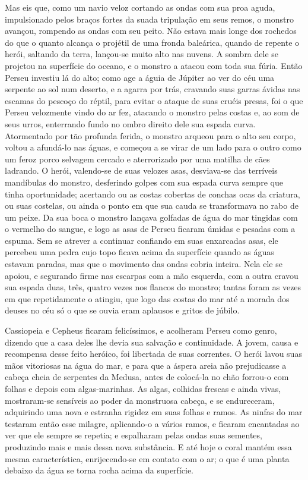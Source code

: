 Mas eis que, como um navio veloz cortando as ondas com sua proa aguda,
impulsionado pelos braços fortes da suada tripulação em seus remos, o
monstro avançou, rompendo as ondas com seu peito. Não estava mais
longe dos rochedos do que o quanto alcança o projétil de uma fronda
baleárica, quando de repente o herói, saltando da terra, lançou-se
muito alto nas nuvens. A sombra dele se projetou na superfície do
oceano, e o monstro a atacou com toda sua fúria. Então Perseu
investiu lá do alto; como age a águia de Júpiter ao ver do céu uma
serpente ao sol num deserto, e a agarra por trás, cravando suas
garras ávidas nas escamas do pescoço do réptil, para evitar o ataque
de suas cruéis presas, foi o que Perseu velozmente vindo do ar fez,
atacando o monstro pelas costas e, ao som de seus urros, enterrando
fundo no ombro direito dele sua espada curva. Atormentado por tão
profunda ferida, o monstro arqueou para o alto seu corpo, voltou a
afundá-lo nas águas, e começou a se virar de um lado para o outro
como um feroz porco selvagem cercado e aterrorizado por uma matilha
de cães ladrando. O herói, valendo-se de suas velozes asas,
desviava-se das terríveis mandíbulas do monstro, desferindo golpes
com sua espada curva sempre que tinha oportunidade; acertando ou as
costas cobertas de conchas ocas da criatura, ou suas costelas, ou
ainda o ponto em que sua cauda se transformava no rabo de um peixe.
Da sua boca o monstro lançava golfadas de água do mar tingidas com o
vermelho do sangue, e logo as asas de Perseu ficaram úmidas e pesadas
com a espuma. Sem se atrever a continuar confiando em suas enxarcadas
asas, ele percebeu uma pedra cujo topo ficava acima da superfície
quando as águas estavam paradas, mas que o movimento das ondas cobria
inteira. Nela ele se apoiou, e segurando firme nas escarpas com a mão
esquerda, com a outra cravou sua espada duas, três, quatro vezes nos
flancos do monstro; tantas foram as vezes em que repetidamente o
atingiu, que logo das costas do mar até a morada dos deuses no céu só
o que se ouvia eram aplausos e gritos de júbilo.

Cassiopeia e Cepheus ficaram felicíssimos, e acolheram Perseu como
genro, dizendo que a casa deles lhe devia sua salvação e
continuidade. A jovem, causa e recompensa desse feito heróico, foi
libertada de suas correntes. O herói lavou suas mãos vitoriosas na
água do mar, e para que a áspera areia não prejudicasse a cabeça
cheia de serpentes da Medusa, antes de colocá-la no chão forrou-o com
folhas e depois com algas-marinhas. As algas, colhidas frescas e
ainda vivas, mostraram-se sensíveis ao poder da monstruosa cabeça, e
se endureceram, adquirindo uma nova e estranha rigidez em suas folhas
e ramos. As ninfas do mar testaram então esse milagre, aplicando-o a
vários ramos, e ficaram encantadas ao ver que ele sempre se repetia;
e espalharam pelas ondas suas sementes, produzindo mais e mais dessa
nova substância. E até hoje o coral mantém essa mesma característica,
enrijecendo-se em contato com o ar; o que é uma planta debaixo da
água se torna rocha acima da superfície.


